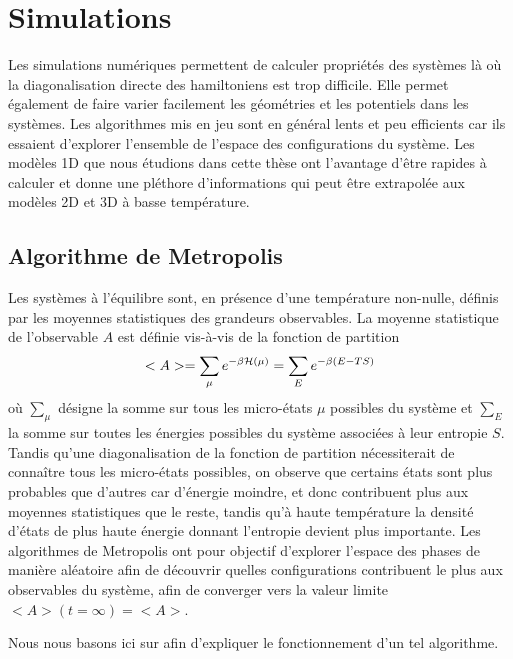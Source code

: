 \chapter{Simulations}

Les simulations numériques permettent de calculer propriétés des systèmes là où la diagonalisation directe des hamiltoniens est trop difficile. Elle permet également de faire varier facilement les géométries et les potentiels dans les systèmes. Les algorithmes mis en jeu sont en général lents et peu efficients car ils essaient d'explorer l'ensemble de l'espace des configurations du système. Les modèles 1D que nous étudions dans cette thèse ont l'avantage d'être rapides à calculer et donne une pléthore d'informations qui peut être extrapolée aux modèles 2D et 3D à basse température. 

\section{Algorithme de Metropolis}

Les systèmes à l'équilibre sont, en présence d'une température non-nulle, définis par les moyennes statistiques des grandeurs observables. La moyenne statistique de l'observable $A$ est définie vis-à-vis de la fonction de partition 
\begin{align}
	<A> = \sum_\mu e^{-\beta \mathcal{H}(\mu)} = \sum_E e^{-\beta(E-T S)}
\end{align}
où $\sum_\mu$ désigne la somme sur tous les micro-états $\mu$ possibles du système et $\sum_E$ la somme sur toutes les énergies possibles du système associées à leur entropie $S$. Tandis qu'une diagonalisation de la fonction de partition nécessiterait de connaître tous les micro-états possibles, on observe que certains états sont plus probables que d'autres car d'énergie moindre, et donc contribuent plus aux moyennes statistiques que le reste, tandis qu'à haute température la densité d'états de plus haute énergie donnant l'entropie devient plus importante.
Les algorithmes de Metropolis ont pour objectif d'explorer l'espace des phases de manière aléatoire afin de découvrir quelles configurations contribuent le plus aux observables du système, afin de converger vers la valeur limite $<A>(t=\infty) = <A>$.

Nous nous basons ici sur \cite{newman_monte_1999} afin d'expliquer le fonctionnement d'un tel algorithme.

